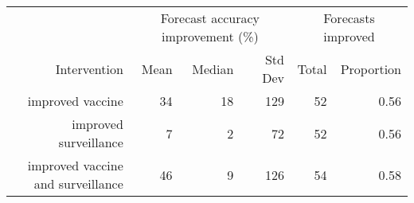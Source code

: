
\begin{tabular*}{1.0\textwidth}{rrrrrr}
\toprule
             & \multicolumn{3}{c}{Forecast accuracy improvement (\%)} & \multicolumn{2}{c}{Forecasts improved} \\
Intervention & Mean & Median & Std Dev & Total & Proportion \\
\midrule

improved vaccine & 34 & 18 & 129 & 52 & 0.56 \\
improved surveillance & 7 & 2 & 72 & 52 & 0.56 \\
improved vaccine and surveillance & 46 & 9 & 126 & 54 & 0.58 \\

\bottomrule
\end{tabular*}

